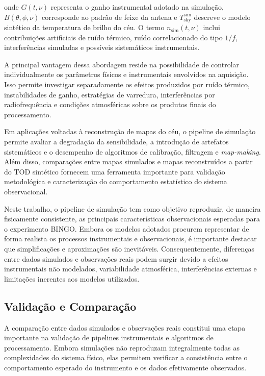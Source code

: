 onde \(G(t,\nu)\) representa o ganho instrumental adotado na simulação, \(B(\theta,\phi,\nu)\) corresponde ao padrão de feixe da antena e \(T_{\mathrm{sky}}^{\mathrm{sim}}\) descreve o modelo sintético da temperatura de brilho do céu. O termo \(n_{\mathrm{sim}}(t,\nu)\) inclui contribuições artificiais de ruído térmico, ruído correlacionado do tipo \(1/f\), interferências simuladas e possíveis sistemáticos instrumentais.

A principal vantagem dessa abordagem reside na possibilidade de controlar individualmente os parâmetros físicos e instrumentais envolvidos na aquisição. Isso permite investigar separadamente os efeitos produzidos por ruído térmico, instabilidades de ganho, estratégias de varredura, interferências por radiofrequência e condições atmosféricas sobre os produtos finais do processamento.

Em aplicações voltadas à reconstrução de mapas do céu, o pipeline de simulação permite avaliar a degradação da sensibilidade, a introdução de artefatos sistemáticos e o desempenho de algoritmos de calibração, filtragem e \textit{map-making}. Além disso, comparações entre mapas simulados e mapas reconstruídos a partir do TOD sintético fornecem uma ferramenta importante para validação metodológica e caracterização do comportamento estatístico do sistema observacional.

Neste trabalho, o pipeline de simulação tem como objetivo reproduzir, de maneira fisicamente consistente, as principais características observacionais esperadas para o experimento BINGO. Embora os modelos adotados procurem representar de forma realista os processos instrumentais e observacionais, é importante destacar que simplificações e aproximações são inevitáveis. Consequentemente, diferenças entre dados simulados e observações reais podem surgir devido a efeitos instrumentais não modelados, variabilidade atmosférica, interferências externas e limitações inerentes aos modelos utilizados.
 
\subsection{Validação e Comparação}

A comparação entre dados simulados e observações reais constitui uma etapa importante na validação de pipelines instrumentais e algoritmos de processamento. Embora simulações não reproduzam integralmente todas as complexidades do sistema físico, elas permitem verificar a consistência entre o comportamento esperado do instrumento e os dados efetivamente observados.

